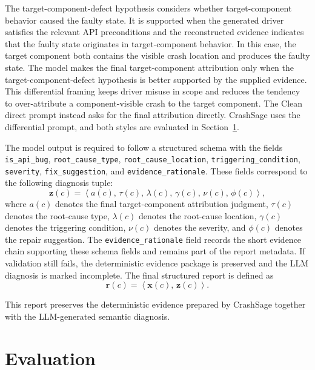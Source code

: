 \documentclass[pdflatex,sn-basic]{sn-jnl}%
\theoremstyle{thmstyleone}%
\theoremstyle{thmstyletwo}%
\theoremstyle{thmstylethree}%
\begin{document}
The target-component-defect hypothesis considers whether target-component behavior caused the faulty state. It is supported when the generated driver satisfies the relevant API preconditions and the reconstructed evidence indicates that the faulty state originates in target-component behavior. In this case, the target component both contains the visible crash location and produces the faulty state. The model makes the final target-component attribution only when the target-component-defect hypothesis is better supported by the supplied evidence. This differential framing keeps driver misuse in scope and reduces the tendency to over-attribute a component-visible crash to the target component. {\color{blue}The Clean direct prompt instead asks for the final attribution directly. CrashSage uses the differential prompt, and both styles are evaluated in Section~\ref{sec:evaluation}.}

The model output is required to follow a structured schema with the fields \texttt{is\_api\_bug}, \texttt{root\_cause\_type}, \texttt{root\_cause\_location}, \texttt{triggering\_condition}, \texttt{severity}, \texttt{fix\_suggestion}, and \texttt{evidence\_rationale}.
These fields correspond to the following diagnosis tuple:
\begin{equation*}
\mathbf{z}(c)=
\left\langle
a(c),\,\tau(c),\,\lambda(c),\,\gamma(c),\,\nu(c),\,\phi(c)
\right\rangle ,
\end{equation*}
where \(a(c)\) denotes the final target-component attribution judgment, \(\tau(c)\) denotes the root-cause type, \(\lambda(c)\) denotes the root-cause location, \(\gamma(c)\) denotes the triggering condition, \(\nu(c)\) denotes the severity, and \(\phi(c)\) denotes the repair suggestion.
The \texttt{evidence\_rationale} field records the short evidence chain supporting these schema fields and remains part of the report metadata.
If validation still fails, the deterministic evidence package is preserved and the LLM diagnosis is marked incomplete.
The final structured report is defined as
\begin{equation*}
\mathbf{r}(c)=
\left\langle
\mathbf{x}(c),\,\mathbf{z}(c)
\right\rangle .
\end{equation*}

This report preserves the deterministic evidence prepared by CrashSage together with the LLM-generated semantic diagnosis.


\section{Evaluation}
\label{sec:evaluation}
\end{document}
